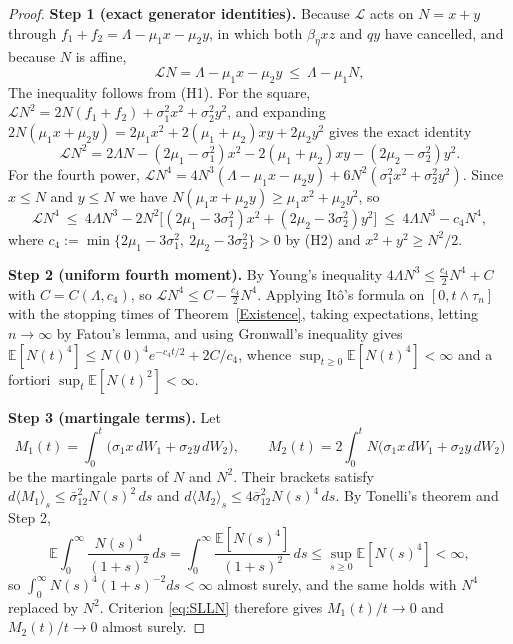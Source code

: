 \documentclass{article}
\newcommand{\betaeta}{\beta_\eta}
\begin{document}
\begin{proof}
\textbf{Step 1 (exact generator identities).} Because $\mathcal{L}$ acts on $N=x+y$ through $f_1+f_2=\Lambda-\mu_1x-\mu_2y$, in which both $\betaeta xz$ and $qy$ have cancelled, and because $N$ is affine,
\begin{equation}\label{eq:LN}
\mathcal{L}N=\Lambda-\mu_1x-\mu_2y\ \le\ \Lambda-\mu_1 N,
\end{equation}
The inequality follows from (H1). For the square, $\mathcal{L}N^2=2N(f_1+f_2)+\sigma_1^2x^2+\sigma_2^2y^2$, and expanding $2N(\mu_1x+\mu_2y)=2\mu_1x^2+2(\mu_1+\mu_2)xy+2\mu_2y^2$ gives the exact identity
\begin{equation}\label{eq:LN2}
\mathcal{L}N^2=2\Lambda N-(2\mu_1-\sigma_1^2)x^2-2(\mu_1+\mu_2)xy-(2\mu_2-\sigma_2^2)y^2 .
\end{equation}
For the fourth power, $\mathcal{L}N^4=4N^3(\Lambda-\mu_1x-\mu_2y)+6N^2(\sigma_1^2x^2+\sigma_2^2y^2)$. Since $x\le N$ and $y\le N$ we have $N(\mu_1x+\mu_2y)\ge\mu_1x^2+\mu_2y^2$, so
\begin{equation}\label{eq:LN4}
\mathcal{L}N^4\ \le\ 4\Lambda N^3-2N^2\big[(2\mu_1-3\sigma_1^2)x^2+(2\mu_2-3\sigma_2^2)y^2\big]\ \le\ 4\Lambda N^3-c_4N^4,
\end{equation}
where $c_4:=\min\{2\mu_1-3\sigma_1^2,\ 2\mu_2-3\sigma_2^2\}>0$ by (H2) and $x^2+y^2\ge N^2/2$.

\textbf{Step 2 (uniform fourth moment).} By Young's inequality $4\Lambda N^3\le\tfrac{c_4}{2}N^4+C$ with $C=C(\Lambda,c_4)$, so $\mathcal{L}N^4\le C-\tfrac{c_4}{2}N^4$. Applying It\^o's formula on $[0,t\wedge\tau_n]$ with the stopping times of Theorem~\ref{Existence}, taking expectations, letting $n\to\infty$ by Fatou's lemma, and using Gronwall's inequality gives
$\mathbb{E}[N(t)^4]\le N(0)^4e^{-c_4t/2}+2C/c_4$, whence $\sup_{t\ge0}\mathbb{E}[N(t)^4]<\infty$ and a fortiori $\sup_t\mathbb{E}[N(t)^2]<\infty$.

\textbf{Step 3 (martingale terms).} Let
\[
M_1(t)=\int_0^t\!\big(\sigma_1x\,dW_1+\sigma_2y\,dW_2\big),\qquad
M_2(t)=2\int_0^t\! N\big(\sigma_1x\,dW_1+\sigma_2y\,dW_2\big)
\]
be the martingale parts of $N$ and $N^2$. Their brackets satisfy $d\langle M_1\rangle_s\le\bar\sigma_{12}^2N(s)^2\,ds$ and $d\langle M_2\rangle_s\le4\bar\sigma_{12}^2N(s)^4\,ds$. By Tonelli's theorem and Step 2,
\[
\mathbb{E}\int_0^\infty\frac{N(s)^4}{(1+s)^2}\,ds=\int_0^\infty\frac{\mathbb{E}[N(s)^4]}{(1+s)^2}\,ds\le\sup_{s\ge0}\mathbb{E}[N(s)^4]<\infty,
\]
so $\int_0^\infty N(s)^4(1+s)^{-2}ds<\infty$ almost surely, and the same holds with $N^4$ replaced by $N^2$. Criterion \eqref{eq:SLLN} therefore gives $M_1(t)/t\to0$ and $M_2(t)/t\to0$ almost surely.


\end{proof}
\end{document}
